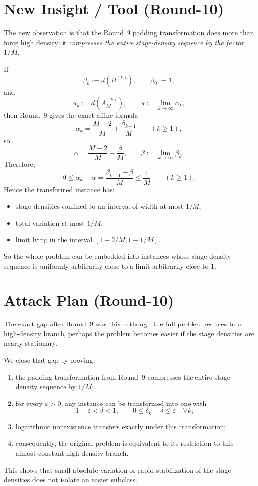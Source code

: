 \section{New Insight / Tool (Round-10)}
The new observation is that the Round~9 padding transformation does more than force high density: it \emph{compresses the entire stage-density sequence by the factor $1/M$}.

If
\[
\beta_k:=d(B^{(k)}),
\qquad \beta_0:=1,
\]
and
\[
\alpha_k:=d(A_M^{(k)}),
\qquad \alpha:=\lim_{k\to\infty}\alpha_k,
\]
then Round~9 gives the exact affine formula
\[
\alpha_k=\frac{M-2}{M}+\frac{\beta_{k-1}}{M}
\qquad (k\ge 1),
\]
so
\[
\alpha=\frac{M-2}{M}+\frac{\beta}{M},
\qquad \beta:=\lim_{k\to\infty}\beta_k.
\]
Therefore,
\[
0\le \alpha_k-\alpha=\frac{\beta_{k-1}-\beta}{M}\le \frac1M
\qquad (k\ge 1).
\]
Hence the transformed instance has:
\begin{itemize}
\item stage densities confined to an interval of width at most $1/M$,
\item total variation at most $1/M$,
\item limit lying in the interval $[1-2/M,1-1/M]$.
\end{itemize}
So the whole problem can be embedded into instances whose stage-density sequence is uniformly arbitrarily close to a limit arbitrarily close to $1$.

\section{Attack Plan (Round-10)}
The exact gap after Round~9 was this: although the full problem reduces to a high-density branch, perhaps the problem becomes easier if the stage densities are nearly stationary.

We close that gap by proving:
\begin{enumerate}
\item the padding transformation from Round~9 compresses the entire stage-density sequence by $1/M$;
\item for every $\varepsilon>0$, any instance can be transformed into one with
\[
1-\varepsilon<\delta<1,
\qquad
0\le \delta_k-\delta\le \varepsilon\quad\forall k;
\]
\item logarithmic nonexistence transfers exactly under this transformation;
\item consequently, the original problem is equivalent to its restriction to this almost-constant high-density branch.
\end{enumerate}
This shows that small absolute variation or rapid stabilization of the stage densities does not isolate an easier subclass.

